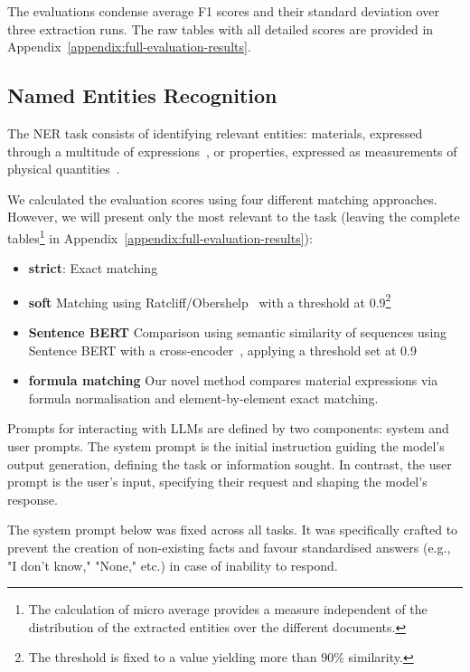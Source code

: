 The evaluations condense average F1 scores and their standard deviation over three extraction runs. The raw tables with all detailed scores are provided in Appendix~\ref{appendix:full-evaluation-results}.

\subsection{Named Entities Recognition}
\label{sec:ner}
The NER task consists of identifying relevant entities: materials, expressed through a multitude of expressions~\cite{lfoppiano2021supermat}, or properties, expressed as measurements of physical quantities~\cite{foppiano2019quantities}. 

We calculated the evaluation scores using four different matching approaches. However, we will present only the most relevant to the task (leaving the complete tables\footnote{The calculation of micro average provides a measure independent of the distribution of the extracted entities over the different documents.} in Appendix~\ref{appendix:full-evaluation-results}): 
\begin{itemize}
    \item \textbf{strict}: Exact matching
    \item \textbf{soft} Matching using Ratcliff/Obershelp~\cite{ratcliff_obershelp} with a threshold at 0.9\footnote{\label{ref:threshold}The threshold is fixed to a value yielding more than 90\% similarity.}
    \item \textbf{Sentence BERT} Comparison using semantic similarity of sequences using Sentence BERT with a cross-encoder~\cite{reimers2019sentencebert}, applying a threshold set at 0.9
    \item \textbf{formula matching} Our novel method compares material expressions via formula normalisation and element-by-element exact matching.
\end{itemize}

Prompts for interacting with LLMs are defined by two components: system and user prompts. 
The system prompt is the initial instruction guiding the model's output generation, defining the task or information sought. In contrast, the user prompt is the user's input, specifying their request and shaping the model's response.

The system prompt below was fixed across all tasks. It was specifically crafted to prevent the creation of non-existing facts and favour standardised answers (e.g., "I don't know," "None," etc.) in case of inability to respond.

